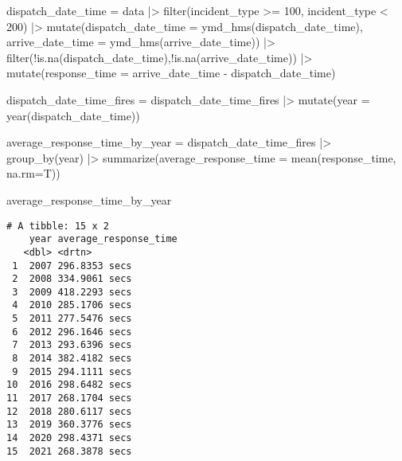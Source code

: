 \documentclass[
  letterpaper,
  DIV=11,
  numbers=noendperiod]{scrartcl}
\newenvironment{Shaded}{\begin{snugshade}}{\end{snugshade}}
\newcommand{\AttributeTok}[1]{\textcolor[rgb]{0.40,0.45,0.13}{#1}}
\newcommand{\DecValTok}[1]{\textcolor[rgb]{0.68,0.00,0.00}{#1}}
\newcommand{\FunctionTok}[1]{\textcolor[rgb]{0.28,0.35,0.67}{#1}}
\newcommand{\NormalTok}[1]{\textcolor[rgb]{0.00,0.23,0.31}{#1}}
\newcommand{\OtherTok}[1]{\textcolor[rgb]{0.00,0.23,0.31}{#1}}
\newcommand{\SpecialCharTok}[1]{\textcolor[rgb]{0.37,0.37,0.37}{#1}}
\begin{document}
\begin{Shaded}
\begin{Highlighting}[]
\NormalTok{dispatch\_date\_time }\OtherTok{=}\NormalTok{ data }\SpecialCharTok{|\textgreater{}}
  \FunctionTok{filter}\NormalTok{(incident\_type }\SpecialCharTok{\textgreater{}=} \DecValTok{100}\NormalTok{, incident\_type }\SpecialCharTok{\textless{}} \DecValTok{200}\NormalTok{) }\SpecialCharTok{|\textgreater{}}
  \FunctionTok{mutate}\NormalTok{(}\AttributeTok{dispatch\_date\_time =} \FunctionTok{ymd\_hms}\NormalTok{(dispatch\_date\_time), }\AttributeTok{arrive\_date\_time =} \FunctionTok{ymd\_hms}\NormalTok{(arrive\_date\_time)) }\SpecialCharTok{|\textgreater{}}
  \FunctionTok{filter}\NormalTok{(}\SpecialCharTok{!}\FunctionTok{is.na}\NormalTok{(dispatch\_date\_time),}\SpecialCharTok{!}\FunctionTok{is.na}\NormalTok{(arrive\_date\_time)) }\SpecialCharTok{|\textgreater{}}
  \FunctionTok{mutate}\NormalTok{(}\AttributeTok{response\_time =}\NormalTok{ arrive\_date\_time }\SpecialCharTok{{-}}\NormalTok{ dispatch\_date\_time) }
  
\NormalTok{dispatch\_date\_time\_fires }\OtherTok{=}\NormalTok{ dispatch\_date\_time\_fires }\SpecialCharTok{|\textgreater{}}
  \FunctionTok{mutate}\NormalTok{(}\AttributeTok{year =} \FunctionTok{year}\NormalTok{(dispatch\_date\_time))}

\NormalTok{average\_response\_time\_by\_year }\OtherTok{=}\NormalTok{ dispatch\_date\_time\_fires }\SpecialCharTok{|\textgreater{}}
  \FunctionTok{group\_by}\NormalTok{(year) }\SpecialCharTok{|\textgreater{}}
  \FunctionTok{summarize}\NormalTok{(}\AttributeTok{average\_response\_time =} \FunctionTok{mean}\NormalTok{(response\_time, }\AttributeTok{na.rm=}\NormalTok{T))}
  
\NormalTok{average\_response\_time\_by\_year}
\end{Highlighting}
\end{Shaded}

\begin{verbatim}
# A tibble: 15 x 2
    year average_response_time
   <dbl> <drtn>               
 1  2007 296.8353 secs        
 2  2008 334.9061 secs        
 3  2009 418.2293 secs        
 4  2010 285.1706 secs        
 5  2011 277.5476 secs        
 6  2012 296.1646 secs        
 7  2013 293.6396 secs        
 8  2014 382.4182 secs        
 9  2015 294.1111 secs        
10  2016 298.6482 secs        
11  2017 268.1704 secs        
12  2018 280.6117 secs        
13  2019 360.3776 secs        
14  2020 298.4371 secs        
15  2021 268.3878 secs        
\end{verbatim}
\end{document}
